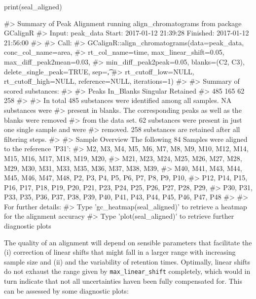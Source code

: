 \begin{Schunk}
\begin{Sinput}
print(seal_aligned)
\end{Sinput}
\begin{Soutput}
#>   Summary of Peak Alignment running align_chromatograms from package GCalignR
#>   Input: peak_data   Start:  2017-01-12 21:39:28     Finished:  2017-01-12 21:56:00 
#> 
#> Call:
#>   GCalignR::align_chromatograms(data=peak_data, conc_col_name=area,
#>   rt_col_name=time, max_linear_shift=0.05, max_diff_peak2mean=0.03,
#>   min_diff_peak2peak=0.05, blanks=(C2, C3), delete_single_peak=TRUE, sep=\t,
#>   rt_cutoff_low=NULL, rt_cutoff_high=NULL, reference=NULL, iterations=1)
#> 
#> Summary of scored substances:
#> 
#>     Peaks In_Blanks  Singular  Retained 
#>       485       165        62       258 
#> 
#>   In total 485 substances were identified among all samples. NA substances were
#>   present in blanks. The corresponding peaks as well as the blanks were removed
#>   from the data set. 62 substances were present in just one single sample and were
#>   removed. 258 substances are retained after all filtering steps.
#> 
#> Sample Overview  The following 84 Samples were aligned to the reference 'P31':
#>   M2, M3, M4, M5, M6, M7, M8, M9, M10, M12, M14, M15, M16, M17, M18, M19, M20,
#>   M21, M23, M24, M25, M26, M27, M28, M29, M30, M31, M33, M35, M36, M37, M38, M39,
#>   M40, M41, M43, M44, M45, M46, M47, M48, P2, P3, P4, P5, P6, P7, P8, P9, P10,
#>   P12, P14, P15, P16, P17, P18, P19, P20, P21, P23, P24, P25, P26, P27, P28, P29,
#>   P30, P31, P33, P35, P36, P37, P38, P39, P40, P41, P43, P44, P45, P46, P47, P48
#> 
#> For further details:
#>   Type 'gc_heatmap(seal_aligned)' to retrieve a heatmap for the alignment accuracy
#>   Type 'plot(seal_aligned)' to retrieve further diagnostic plots
\end{Soutput}
\end{Schunk}

The quality of an alignment will depend on sensible parameters that
facilitate the (i) correction of linear shifts that might fall in a
larger range with increasing sample size and (ii) and the variability of
retention times. Optimally, linear shifts do not exhaust the range given
by \texttt{max\_linear\_shift} completely, which would in turn indicate
that not all uncertainties haven been fully compensated for. This can be
assessed by some diagnostic plots:

